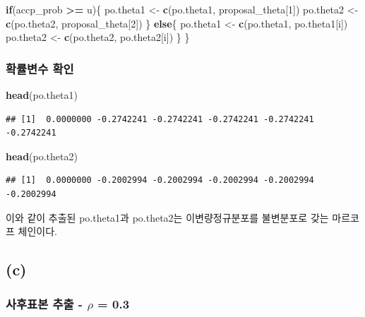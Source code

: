 \documentclass[
]{article}
\newenvironment{Shaded}{\begin{snugshade}}{\end{snugshade}}
\newcommand{\ControlFlowTok}[1]{\textcolor[rgb]{0.13,0.29,0.53}{\textbf{#1}}}
\newcommand{\DecValTok}[1]{\textcolor[rgb]{0.00,0.00,0.81}{#1}}
\newcommand{\FunctionTok}[1]{\textcolor[rgb]{0.13,0.29,0.53}{\textbf{#1}}}
\newcommand{\NormalTok}[1]{#1}
\newcommand{\OtherTok}[1]{\textcolor[rgb]{0.56,0.35,0.01}{#1}}
\newcommand{\SpecialCharTok}[1]{\textcolor[rgb]{0.81,0.36,0.00}{\textbf{#1}}}
\begin{document}
\begin{Shaded}
\begin{Highlighting}[]
  \ControlFlowTok{if}\NormalTok{(accp\_prob }\SpecialCharTok{\textgreater{}=}\NormalTok{ u)\{}
\NormalTok{    po.theta1 }\OtherTok{\textless{}{-}} \FunctionTok{c}\NormalTok{(po.theta1, proposal\_theta[}\DecValTok{1}\NormalTok{])}
\NormalTok{    po.theta2 }\OtherTok{\textless{}{-}} \FunctionTok{c}\NormalTok{(po.theta2, proposal\_theta[}\DecValTok{2}\NormalTok{])}
\NormalTok{  \} }\ControlFlowTok{else}\NormalTok{\{}
\NormalTok{    po.theta1 }\OtherTok{\textless{}{-}} \FunctionTok{c}\NormalTok{(po.theta1, po.theta1[i])}
\NormalTok{    po.theta2 }\OtherTok{\textless{}{-}} \FunctionTok{c}\NormalTok{(po.theta2, po.theta2[i])}
\NormalTok{  \}}
\NormalTok{\}}
\end{Highlighting}
\end{Shaded}

\subsubsection{확률변수
확인}\label{uxd655uxb960uxbcc0uxc218-uxd655uxc778}

\begin{Shaded}
\begin{Highlighting}[]
\FunctionTok{head}\NormalTok{(po.theta1)}
\end{Highlighting}
\end{Shaded}

\begin{verbatim}
## [1]  0.0000000 -0.2742241 -0.2742241 -0.2742241 -0.2742241 -0.2742241
\end{verbatim}

\begin{Shaded}
\begin{Highlighting}[]
\FunctionTok{head}\NormalTok{(po.theta2)}
\end{Highlighting}
\end{Shaded}

\begin{verbatim}
## [1]  0.0000000 -0.2002994 -0.2002994 -0.2002994 -0.2002994 -0.2002994
\end{verbatim}

이와 같이 추출된 po.theta1과 po.theta2는 이변량정규분포를 불변분포로
갖는 마르코프 체인이다.

\subsection{(c)}\label{c}

\subsubsection{\texorpdfstring{사후표본 추출 - \(\rho\) =
0.3}{사후표본 추출 - \textbackslash rho = 0.3}}\label{uxc0acuxd6c4uxd45cuxbcf8-uxcd94uxcd9c---rho-0.3}
\end{document}
